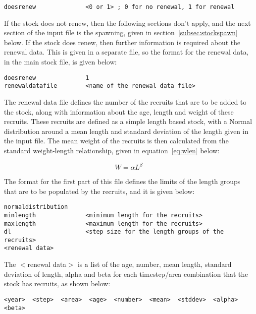 \documentclass [a4paper, 10pt]{book}
\begin{document}
{\small\begin{verbatim}
doesrenew              <0 or 1> ; 0 for no renewal, 1 for renewal
\end{verbatim}}

If the stock does not renew, then the following sections don't apply, and the next section of the input file is the spawning, given in section~\ref{subsec:stockspawn} below.  If the stock does renew, then further information is required about the renewal data.  This is given in a separate file, so the format for the renewal data, in the main stock file, is given below:

{\small\begin{verbatim}
doesrenew              1
renewaldatafile        <name of the renewal data file>
\end{verbatim}}

The renewal data file defines the number of the recruits that are to be added to the stock, along with information about the age, length and weight of these recruits.  These recruits are defined as a simple length based stock, with a Normal distribution around a mean length and standard deviation of the length given in the input file.  The mean weight of the recruits is then calculated from the standard weight-length relationship, given in equation~\ref{eq:wlen} below:

\begin{equation}\label{eq:wlen}
W = \alpha L ^\beta
\end{equation}

The format for the first part of this file defines the limits of the length groups that are to be populated by the recruits, and it is given below:

{\small\begin{verbatim}
normaldistribution
minlength              <minimum length for the recruits>
maxlength              <maximum length for the recruits>
dl                     <step size for the length groups of the recruits>
<renewal data>
\end{verbatim}}

The $<$renewal data$>$ is a list of the age, number, mean length, standard deviation of length, alpha and beta for each timestep/area combination that the stock has recruits, as shown below:

{\small\begin{verbatim}
<year>  <step>  <area>  <age>  <number>  <mean>  <stddev>  <alpha>  <beta>
\end{verbatim}}
\end{document}
